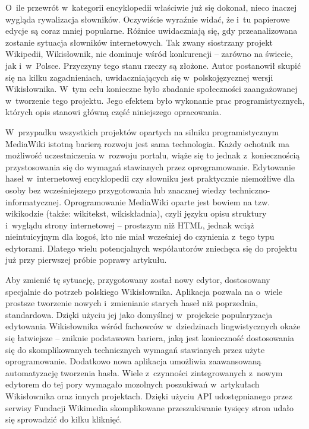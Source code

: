 \documentclass{pracamgr}
\begin{document}
O~ile przewrót w~kategorii encyklopedii właściwie już się dokonał, nieco inaczej wygląda rywalizacja słowników. Oczywiście wyraźnie widać, że i~tu papierowe edycje są coraz mniej popularne. Różnice uwidaczniają się, gdy przeanalizowana zostanie sytuacja słowników internetowych. Tak zwany siostrzany projekt Wikipedii, Wikisłownik, nie dominuje wśród konkurencji -- zarówno na świecie, jak i~w~Polsce. Przyczyny tego stanu rzeczy są złożone. Autor postanowił skupić się na kilku zagadnieniach, uwidaczniających się w~polskojęzycznej wersji Wikisłownika. W~tym celu konieczne było zbadanie społeczności zaangażowanej w~tworzenie tego projektu. Jego efektem było wykonanie prac programistycznych, których opis stanowi główną część niniejszego opracowania.

W~przypadku wszystkich projektów opartych na silniku programistycznym MediaWiki istotną barierą rozwoju jest sama technologia. Każdy ochotnik ma możliwość uczestniczenia w~rozwoju portalu, wiąże się to jednak z~koniecznością przystosowania się do wymagań stawianych przez oprogramowanie. Edytowanie haseł w~internetowej encyklopedii czy słowniku jest praktycznie niemożliwe dla osoby bez wcześniejszego przygotowania lub znacznej wiedzy techniczno-informatycznej. Oprogramowanie MediaWiki oparte jest bowiem na tzw. wikikodzie (także: wikitekst, wikiskładnia), czyli języku opisu struktury i~wyglądu strony internetowej -- prostszym niż HTML, jednak wciąż nieintuicyjnym dla kogoś, kto nie miał wcześniej do czynienia z~tego typu edytorami. Dlatego wielu potencjalnych współautorów zniechęca się do projektu już przy pierwszej próbie poprawy artykułu.

Aby zmienić tę sytuację, przygotowany został nowy edytor, dostosowany specjalnie do potrzeb polskiego Wikisłownika. Aplikacja pozwala na o~wiele prostsze tworzenie nowych i~zmienianie starych haseł niż poprzednia, standardowa. Dzięki użyciu jej jako domyślnej w~projekcie popularyzacja edytowania Wikisłownika wśród fachowców w~dziedzinach lingwistycznych okaże się łatwiejsze -- zniknie podstawowa bariera, jaką jest konieczność dostosowania się do skomplikowanych technicznych wymagań stawianych przez użyte oprogramowanie. Dodatkowo nowa aplikacja umożliwia zaawansowaną automatyzację tworzenia hasła. Wiele z~czynności zintegrowanych z~nowym edytorem do tej pory wymagało mozolnych poszukiwań w~artykułach Wikisłownika oraz innych projektach. Dzięki użyciu API udostępnianego przez serwisy Fundacji Wikimedia skomplikowane przeszukiwanie tysięcy stron udało się sprowadzić do kilku kliknięć.
\end{document}
